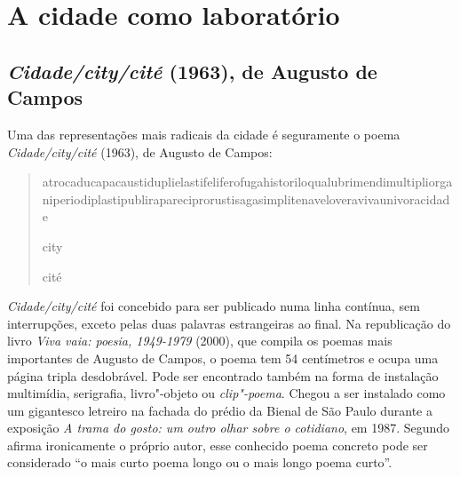 \part{A cidade como laboratório}
\removeepigraph

\chapter{\emph{Cidade/city/cité} (1963), de Augusto de Campos}

Uma das representações mais radicais da cidade é seguramente o poema
\emph{Cidade/city/cité} (1963), de Augusto de Campos:

\begin{quote}
atrocaducapacaustiduplielastifeliferofugahistoriloqualubrimendimultipliorganiperiodiplastipublirapareciprorustisagasimplitenaveloveravivaunivoracidade

\hfill{city}

\hfill{cité}
\end{quote}

\emph{Cidade/city/cité} foi concebido para ser publicado numa linha
contínua, sem interrupções, exceto pelas duas palavras estrangeiras ao
final. Na republicação do livro \emph{Viva vaia: poesia, 1949-1979}
(2000), que compila os poemas mais importantes de Augusto de Campos, o
poema tem 54 centímetros e ocupa uma página tripla desdobrável. Pode ser
encontrado também na forma de instalação multimídia, serigrafia,
livro"-objeto ou \emph{clip"-poema}. Chegou a ser instalado como um
gigantesco letreiro na fachada do prédio da Bienal de São Paulo durante
a exposição \emph{A trama do gosto: um outro olhar sobre o cotidiano},
em 1987. Segundo afirma ironicamente o próprio autor, esse conhecido
poema concreto pode ser considerado ``o mais curto poema longo ou o mais
longo poema curto''.

